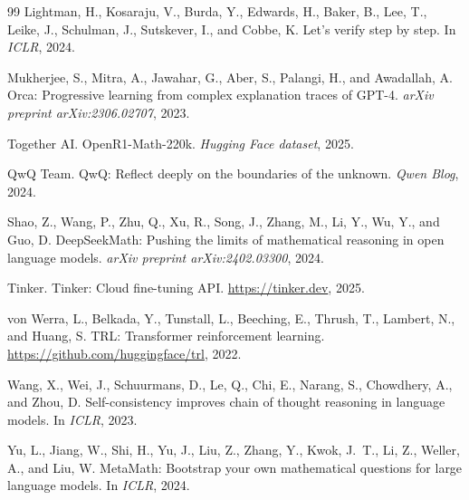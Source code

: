 \documentclass[11pt,a4paper]{article}
\begin{document}
\begin{thebibliography}{99}
Lightman, H., Kosaraju, V., Burda, Y., Edwards, H., Baker, B., Lee, T., Leike, J., Schulman, J., Sutskever, I., and Cobbe, K.
\newblock Let's verify step by step.
\newblock In \emph{ICLR}, 2024.

Mukherjee, S., Mitra, A., Jawahar, G., Aber, S., Palangi, H., and Awadallah, A.
\newblock Orca: Progressive learning from complex explanation traces of GPT-4.
\newblock \emph{arXiv preprint arXiv:2306.02707}, 2023.

Together AI.
\newblock OpenR1-Math-220k.
\newblock \emph{Hugging Face dataset}, 2025.

QwQ Team.
\newblock QwQ: Reflect deeply on the boundaries of the unknown.
\newblock \emph{Qwen Blog}, 2024.

Shao, Z., Wang, P., Zhu, Q., Xu, R., Song, J., Zhang, M., Li, Y., Wu, Y., and Guo, D.
\newblock DeepSeekMath: Pushing the limits of mathematical reasoning in open language models.
\newblock \emph{arXiv preprint arXiv:2402.03300}, 2024.

Tinker.
\newblock Tinker: Cloud fine-tuning API.
\newblock \url{https://tinker.dev}, 2025.

von Werra, L., Belkada, Y., Tunstall, L., Beeching, E., Thrush, T., Lambert, N., and Huang, S.
\newblock TRL: Transformer reinforcement learning.
\newblock \url{https://github.com/huggingface/trl}, 2022.

Wang, X., Wei, J., Schuurmans, D., Le, Q., Chi, E., Narang, S., Chowdhery, A., and Zhou, D.
\newblock Self-consistency improves chain of thought reasoning in language models.
\newblock In \emph{ICLR}, 2023.

Yu, L., Jiang, W., Shi, H., Yu, J., Liu, Z., Zhang, Y., Kwok, J.~T., Li, Z., Weller, A., and Liu, W.
\newblock MetaMath: Bootstrap your own mathematical questions for large language models.
\newblock In \emph{ICLR}, 2024.

\end{thebibliography}
\end{document}
